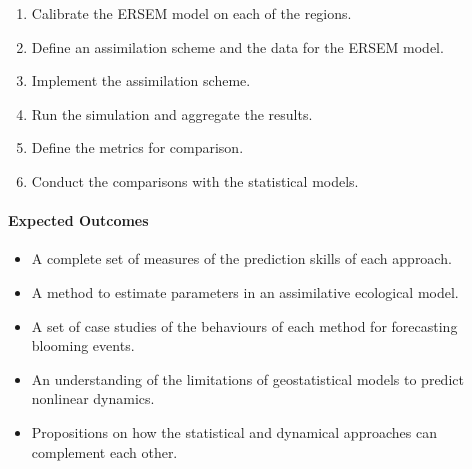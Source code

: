 \begin{enumerate}

\item Calibrate the ERSEM model on each of the regions.

\item Define an assimilation scheme and the data for the ERSEM model.

\item Implement the assimilation scheme.

\item Run the simulation and aggregate the results.

\item Define the metrics for comparison.

\item Conduct the comparisons with the statistical models.

\end{enumerate}

\paragraph{Expected Outcomes}

\begin{itemize}

\item A complete set of measures of the prediction skills of each approach.

\item A method to estimate parameters in an assimilative ecological model.

\item A set of case studies of the behaviours of each method for forecasting
blooming events.

\item An understanding of the limitations of geostatistical models to predict
nonlinear dynamics. 

\item Propositions on how the statistical and dynamical approaches can
complement each other.

\end{itemize}
